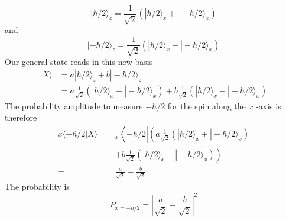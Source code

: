 $$
|\hbar / 2\rangle_{z}=\frac{1}{\sqrt{2}}\left(|\hbar / 2\rangle_{x}+|-\hbar / 2\rangle_{x}\right)
$$
and
$$
|-\hbar / 2\rangle_{z}=\frac{1}{\sqrt{2}}\left(|\hbar / 2\rangle_{x}-|-\hbar / 2\rangle_{x}\right)
$$
Our general state reads in this new basis
$$
\begin{aligned}
|X\rangle &= a|\hbar / 2\rangle_{z}+b|-\hbar / 2\rangle_{z} \\
&=a \frac{1}{\sqrt{2}}\left(|\hbar / 2\rangle_{x}+|-\hbar / 2\rangle_{x}\right)+b \frac{1}{\sqrt{2}}\left(|\hbar / 2\rangle_{x}-|-\hbar / 2\rangle_{x}\right)
\end{aligned}
$$
The probability amplitude to measure $-\hbar / 2$ for the spin along the $x$ -axis is therefore
$$
\begin{aligned}
x\langle-\hbar / 2 | X\rangle=&_{x}\left\langle-\hbar / 2\left|\left(a \frac{1}{\sqrt{2}}\left(|\hbar / 2\rangle_{x}+|-\hbar / 2\rangle_{x}\right)\right.\right.\right.\\
&\left.+b \frac{1}{\sqrt{2}}\left(|\hbar / 2\rangle_{x}-|-\hbar / 2\rangle_{x}\right)\right) \\
=& \frac{a}{\sqrt{2}}-\frac{b}{\sqrt{2}}
\end{aligned}
$$
The probability is
\[
P_{x=-h / 2}=\left|\frac{a}{\sqrt{2}}-\frac{b}{\sqrt{2}}\right|^{2}
\]

